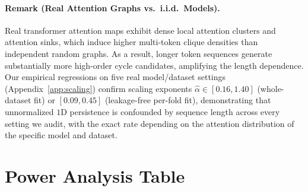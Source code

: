 \documentclass{article}
\begin{document}
\paragraph{Remark (Real Attention Graphs vs.\ i.i.d.\ Models).}
Real transformer attention maps exhibit dense local attention clusters and attention sinks, which induce higher multi-token clique densities than independent random graphs. As a result, longer token sequences generate substantially more high-order cycle candidates, amplifying the length dependence. Our empirical regressions on five real model/dataset settings (Appendix~\ref{app:scaling}) confirm scaling exponents $\hat{\alpha} \in [0.16, 1.40]$ (whole-dataset fit) or $[0.09, 0.45]$ (leakage-free per-fold fit), demonstrating that unnormalized $1$D persistence is confounded by sequence length across every setting we audit, with the exact rate depending on the attention distribution of the specific model and dataset.

\section{Power Analysis Table}
\label{app:power}

\begin{table}[ht]
\centering
\small
{}
\caption{\textbf{Power Analysis: Minimum Detectable Effect (MDE) in $\Delta$AUC.} HaluEval benchmarks with $\ge 500$ groups are well-powered; TruthfulQA benchmarks with 150 groups have limited power at $\Delta=0.015$ resolution. MDE $= 2.802 \cdot \hat{\sigma}$ at 80\% power, $\alpha=0.05$ (two-sided). Bootstrap SE estimated from 10,000 cluster-bootstrap resamples.}
\label{tab:power}
\end{table}
\end{document}
